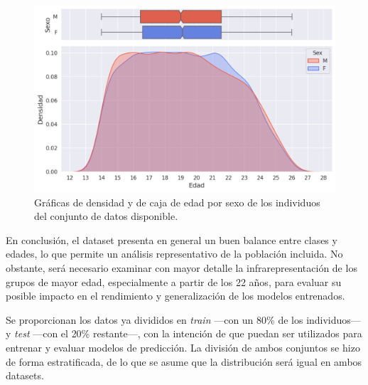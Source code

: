 \begin{figure}[htbp]
    \centering
    \includegraphics[width=\textwidth]{capitulos/cap_04/imagenes/kdeplot_ages.png}
    \caption[
        Gráficas de densidad y de caja de edad por sexo de los individuos del conjunto de datos disponible.
    ]{
        Gráficas de densidad y de caja de edad por sexo de los individuos del conjunto de datos disponible. 
    } 
    \label{fig:kde_and_boxplot_ages_sex}
\end{figure}

En conclusión, el dataset presenta en general un buen balance entre clases y edades, lo que permite un análisis representativo de la población incluida. No obstante, será necesario examinar con mayor detalle la infrarepresentación de los grupos de mayor edad, especialmente a partir de los 22 años, para evaluar su posible impacto en el rendimiento y generalización de los modelos entrenados.

Se proporcionan los datos ya divididos en \textit{train} ---con un 80\% de los individuos--- y \textit{test} ---con el 20\% restante---, con la intención de que puedan ser utilizados para entrenar y evaluar modelos de predicción. La división de ambos conjuntos se hizo de forma estratificada, de lo que se asume que la distribución será igual en ambos datasets. 



